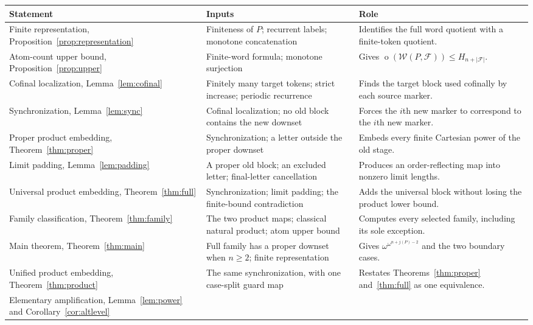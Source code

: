 \documentclass[11pt,a4paper]{article}
\numberwithin{equation}{section}
\theoremstyle{definition}
\theoremstyle{remark}
\newcommand{\mot}{\mathop{o}}
\newcommand{\W}{\mathcal W}
\newcommand{\F}{\mathcal F}
\begin{document}
\begin{longtable}{@{}>{\raggedright\arraybackslash}p{}>{\raggedright\arraybackslash}p{}>{\raggedright\arraybackslash}p{}@{}}
\toprule
Statement & Inputs & Role\\
\midrule
\endhead
Finite representation, Proposition~\ref{prop:representation}
 & Finiteness of $P$; recurrent labels; monotone concatenation
 & Identifies the full word quotient with a finite-token quotient.\\[3pt]
Atom-count upper bound, Proposition~\ref{prop:upper}
 & Finite-word formula; monotone surjection
 & Gives $\mot(\W(P,\F))\le H_{n+|\F|}$.\\[3pt]
Cofinal localization, Lemma~\ref{lem:cofinal}
 & Finitely many target tokens; strict increase; periodic recurrence
 & Finds the target block used cofinally by each source marker.\\[3pt]
Synchronization, Lemma~\ref{lem:sync}
 & Cofinal localization; no old block contains the new downset
 & Forces the $i$th new marker to correspond to the $i$th new marker.\\[3pt]
Proper product embedding, Theorem~\ref{thm:proper}
 & Synchronization; a letter outside the proper downset
 & Embeds every finite Cartesian power of the old stage.\\[3pt]
Limit padding, Lemma~\ref{lem:padding}
 & A proper old block; an excluded letter; final-letter cancellation
 & Produces an order-reflecting map into nonzero limit lengths.\\[3pt]
Universal product embedding, Theorem~\ref{thm:full}
 & Synchronization; limit padding; the finite-bound contradiction
 & Adds the universal block without losing the product lower bound.\\[3pt]
Family classification, Theorem~\ref{thm:family}
 & The two product maps; classical natural product; atom upper bound
 & Computes every selected family, including its sole exception.\\[3pt]
Main theorem, Theorem~\ref{thm:main}
 & Full family has a proper downset when $n\ge2$; finite representation
 & Gives $\omega^{\omega^{n+j(P)-2}}$ and the two boundary cases.\\[3pt]
Unified product embedding, Theorem~\ref{thm:product}
 & The same synchronization, with one case-split guard map
 & Restates Theorems~\ref{thm:proper} and~\ref{thm:full} as one equivalence.\\[3pt]
Elementary amplification, Lemma~\ref{lem:power} and
Corollary~\ref{cor:altlevel}

\end{longtable}
\end{document}
